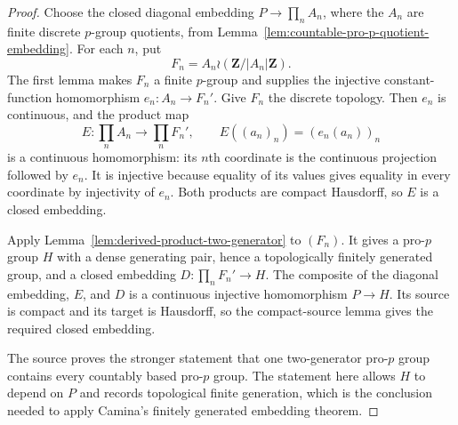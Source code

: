 \begin{proof}
Choose the closed diagonal embedding
$P\to\prod_n A_n$, where the $A_n$ are finite discrete
$p$-group quotients, from
Lemma~\ref{lem:countable-pro-p-quotient-embedding}.
For each $n$, put
\[
 F_n=A_n\wr(\mathbf Z/|A_n|\mathbf Z).
\]
The first lemma makes $F_n$ a finite $p$-group and supplies
the injective constant-function homomorphism $e_n:A_n\to F_n'$.
Give $F_n$ the discrete topology. Then $e_n$ is continuous,
and the product map
\[
 E:\prod_n A_n\longrightarrow\prod_n F_n',
 \qquad E((a_n)_n)=(e_n(a_n))_n
\]
is a continuous homomorphism: its $n$th coordinate is the
continuous projection followed by $e_n$.
It is injective because equality of its values gives equality
in every coordinate by injectivity of $e_n$.
Both products are compact Hausdorff, so $E$ is a closed embedding.

Apply Lemma~\ref{lem:derived-product-two-generator} to $(F_n)$.
It gives a pro-$p$ group $H$ with a dense generating pair,
hence a topologically finitely generated group, and a closed
embedding $D:\prod_n F_n'\to H$.
The composite of the diagonal embedding, $E$, and $D$ is a
continuous injective homomorphism $P\to H$.
Its source is compact and its target is Hausdorff, so the
compact-source lemma gives the required closed embedding.

The source proves the stronger statement that one two-generator
pro-$p$ group contains every countably based pro-$p$ group.
The statement here allows $H$ to depend on $P$ and records
topological finite generation, which is the conclusion needed
to apply Camina's finitely generated embedding theorem.
\end{proof}
